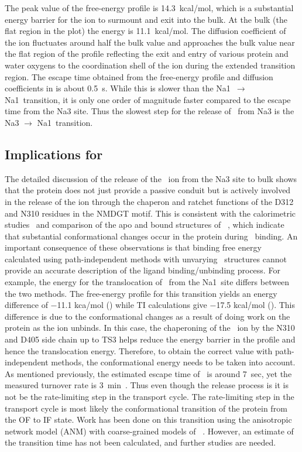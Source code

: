 The peak value of the free-energy profile is 14.3~kcal/mol, which is a substantial energy barrier for 
the ion to surmount and exit into the bulk. At the bulk (the flat region in the plot) the energy is 11.1~kcal/mol. 
The diffusion coefficient of the ion fluctuates around half the bulk value and approaches the bulk value 
near the flat region of the profile reflecting the exit and entry of various protein and water oxygens 
to the coordination shell of the ion during the extended transition region. The escape time obtained 
from the free-energy profile and diffusion coefficients in  is about 0.5~s. While 
this is slower than the Na1\prim\ $\rightarrow$ Na1\dprim\ transition, it is only one order of magnitude 
faster compared to the escape time from the Na3 site. Thus the slowest step for the release of \Na\ from 
Na3 is the Na3 $\rightarrow$ Na1\prim\ transition.

\subsection{Implications for \GltPh}
The detailed discussion of the release of the \Na\ ion from the Na3 site to bulk shows that the 
protein does not just provide a passive conduit but is actively involved in the release of the ion 
through the chaperon and ratchet functions of the D312 and N310 residues in the NMDGT motif. This is 
consistent with the calorimetric studies~\cite{Reyes2013b,Hanelt2015,Ewers2013} and comparison of the 
apo and bound structures of \GltPh~\cite{Verdon2014}, which indicate that substantial conformational 
changes occur in the protein during \Na\ binding. An important consequence of these observations is 
that binding free energy calculated using path-independent methods with unvarying \GltPh\ structures 
cannot provide an accurate description of the ligand binding/unbinding process. For example, the energy 
for the translocation of \Na\ from the Na1\dprim\ site differs between the two methods. The free-energy 
profile for this transition yields an energy difference of $-$11.1 kca/mol () while 
TI calculations give $-$17.5 kcal/mol (). This difference is due to the conformational 
changes as a result of doing work on the protein as the ion unbinds. In this case, the chaperoning of 
the \Na\ ion by the N310 and D405 side chain up to TS3 helps reduce the energy barrier in the profile 
and hence the translocation energy. Therefore, to obtain the correct value with path-independent 
methods, the conformational energy needs to be taken into account. As mentioned previously, the 
estimated escape time of \Na\ is around 7~sec, yet the measured turnover rate is 3~min~\cite{Ryan2009}. 
Thus even though the release process is it is not be the rate-limiting step in the transport cycle. 
The rate-limiting step in the transport cycle is most likely the conformational transition of the 
protein from the OF to IF state. Work has been done on this transition using the anisotropic network 
model (ANM) with coarse-grained models of \GltPh~\cite{Das2014}. However, an estimate of the 
transition time has not been calculated, and further studies are needed.

